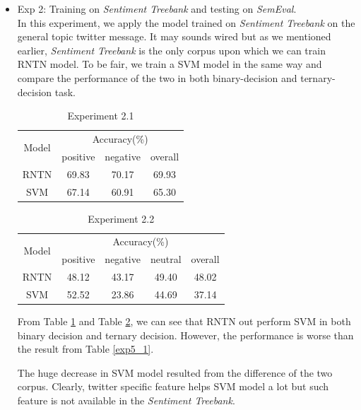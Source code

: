 \begin{itemize}
\item Exp 2: Training on \textit{Sentiment Treebank} and testing on \textit{SemEval}. \\ 
In this experiment, we apply the model trained on \textit{Sentiment Treebank} on the general topic twitter message. It may sounds wired but as we mentioned earlier, \textit{Sentiment Treebank} is the only corpus upon which we can train RNTN model. To be fair, we train a SVM model in the same way and compare the performance of the two in both binary-decision and ternary-decision task. 
\begin{table}[H]
  \begin{center}
    \begin{tabular}{cccc}\hline
      \multirow{2}{*}{Model} 
      & \multicolumn{3}{c}{Accuracy(\%)} \\\cline{2-4}
    & positive & negative & overall \\ \hline
    RNTN  & 69.83     &   70.17	    &   69.93    \\ 
    SVM   & 67.14     &   60.91     &   65.30      \\ \hline
    \end{tabular}
    \end{center}
    \caption{\label{exp5_2_1} Experiment 2.1}
\end{table}

\begin{table}[H]
  \begin{center}
    \begin{tabular}{ccccc}\hline
      \multirow{2}{*}{Model} 
      & \multicolumn{4}{c}{Accuracy(\%)} \\\cline{2-5}
    & positive & negative & neutral & overall \\ \hline
    RNTN  & 48.12    &   43.17  	   &   49.40       & 48.02    \\ 
    SVM   & 52.52    &   23.86     &   44.69       & 37.14    \\ \hline
    \end{tabular}
    \end{center}
    \caption{\label{exp5_2_2} Experiment 2.2}
\end{table}

From Table \ref{exp5_2_1} and Table \ref{exp5_2_2}, we can see that RNTN out perform SVM in both binary decision and ternary decision. However, the performance is worse than the result from Table \ref{exp5_1}. 

The huge decrease in SVM model resulted from the difference of the two corpus. 
Clearly, twitter specific feature helps SVM model a lot but such feature is not available in the \textit{Sentiment Treebank}. 


\end{itemize}
